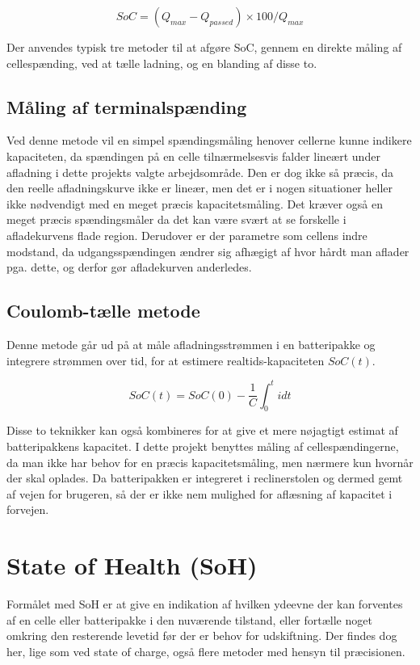 \begin {equation} 
SoC = (Q_{max}-Q_{passed})\times 100/Q_{max} \label{eq:soc}
\end {equation}

Der anvendes typisk tre metoder til at afgøre SoC, gennem en direkte måling af cellespænding, ved at tælle ladning, og en blanding af disse to.

\subsection{Måling af terminalspænding}
Ved denne metode vil en simpel spændingsmåling henover cellerne kunne indikere kapaciteten, da spændingen på en celle tilnærmelsesvis falder lineært under afladning i dette projekts valgte arbejdsområde. Den er dog ikke så præcis, da den reelle afladningskurve ikke er lineær, men det er i nogen situationer heller ikke nødvendigt med en meget præcis kapacitetsmåling. Det kræver også en meget præcis spændingsmåler da det kan være svært at se forskelle i afladekurvens flade region. Derudover er der parametre som cellens indre modstand, da udgangsspændingen ændrer sig afhægigt af hvor hårdt man aflader pga. dette, og derfor gør afladekurven anderledes. 

\subsection{Coulomb-tælle metode}
Denne metode går ud på at måle afladningsstrømmen i en batteripakke og integrere strømmen over tid, for at estimere realtids-kapaciteten $SoC(t)$. 

\begin {equation} 
SoC(t) = SoC(0) - \frac{1}{C} \int_{0}^{t} idt  \label{eq:coulomb-count}
\end {equation}

Disse to teknikker kan også kombineres for at give et mere nøjagtigt estimat af batteripakkens kapacitet. I dette projekt benyttes måling af cellespændingerne, da man ikke har behov for en præcis kapacitetsmåling, men nærmere kun hvornår der skal oplades. Da batteripakken er integreret i reclinerstolen og dermed gemt af vejen for brugeren, så der er ikke nem mulighed for aflæsning af kapacitet i forvejen. 

\section{State of Health (SoH)}
Formålet med SoH er at give en indikation af hvilken ydeevne der kan forventes af en celle eller batteripakke i den nuværende tilstand, eller fortælle noget omkring den resterende levetid før der er behov for udskiftning. Der findes dog her, lige som ved state of charge, også flere metoder med hensyn til præcisionen. 

